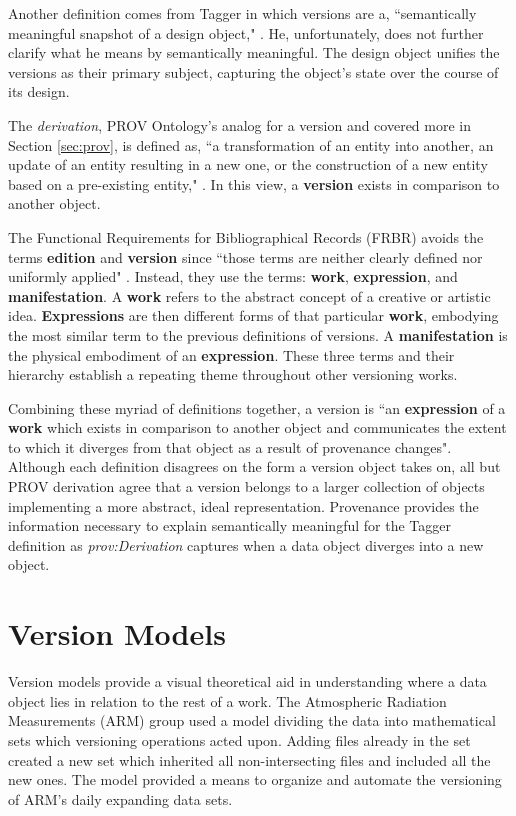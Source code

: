 Another definition comes from Tagger in which versions are a, ``semantically meaningful snapshot of a design object," \cite{Tagger2005}.
He, unfortunately, does not further clarify what he means by semantically meaningful.
The design object unifies the versions as their primary subject, capturing the object's state over the course of its design.

The \textit{derivation}, PROV Ontology's analog for a version and covered more in Section \ref{sec:prov}, is defined as, ``a transformation of an entity into another, an update of an entity resulting in a new one, or the construction of a new entity based on a pre-existing entity," \cite{Lebo2013}.
In this view, a \textbf{version} exists in comparison to another object.

The Functional Requirements for Bibliographical Records (FRBR) avoids the terms \textbf{edition} and \textbf{version} since ``those terms are neither clearly defined nor uniformly applied" \cite{frbr}.
Instead, they use the terms: \textbf{work}, \textbf{expression}, and \textbf{manifestation}.
A \textbf{work} refers to the abstract concept of a creative or artistic idea.
\textbf{Expressions} are then different forms of that particular \textbf{work}, embodying the most similar term to the previous definitions of versions.
A \textbf{manifestation} is the physical embodiment of an \textbf{expression}.
These three terms and their hierarchy establish a repeating theme throughout other versioning works.

Combining these myriad of definitions together, a version is ``an \textbf{expression} of a \textbf{work} which exists in comparison to another object and communicates the extent to which it diverges from that object as a result of provenance changes".
Although each definition disagrees on the form a version object takes on, all but PROV derivation agree that a version belongs to a larger collection of objects implementing a more abstract, ideal representation.
Provenance provides the information necessary to explain semantically meaningful for the Tagger definition as \textit{prov:Derivation} captures when a data object diverges into a new object.


\section{Version Models} \label{sec:models}

Version models provide a visual theoretical aid in understanding where a data object lies in relation to the rest of a work.
The Atmospheric Radiation Measurements (ARM) group used a model dividing the data into mathematical sets which versioning operations acted upon\cite{6906868}.
Adding files already in the set created a new set which inherited all non-intersecting files and included all the new ones.
The model provided a means to organize and automate the versioning of ARM's daily expanding data sets.

